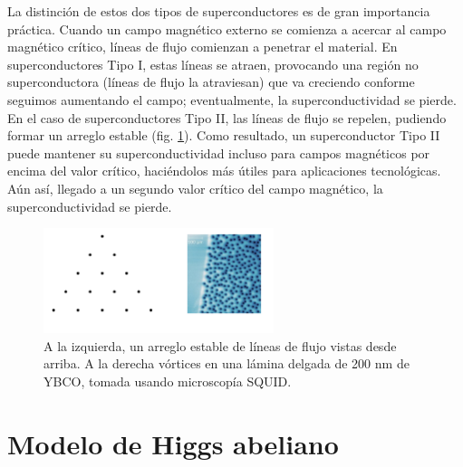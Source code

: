 La distinción de estos dos tipos de superconductores es de gran importancia práctica. Cuando un campo magnético externo se comienza a acercar al campo magnético crítico, líneas de flujo comienzan a penetrar el material. En superconductores Tipo I, estas líneas se atraen, provocando una región no superconductora (líneas de flujo la atraviesan) que va creciendo conforme seguimos aumentando el campo; eventualmente, la superconductividad se pierde. En el caso de superconductores Tipo II, las líneas de flujo se repelen, pudiendo formar un arreglo estable (fig. \ref{fig:4}). Como resultado, un superconductor Tipo II puede mantener su superconductividad incluso para campos magnéticos por encima del valor crítico, haciéndolos más útiles para aplicaciones tecnológicas.  Aún así, llegado a un segundo valor crítico del campo magnético, la superconductividad se pierde.

\begin{figure}[ht]
	\centering
	\includegraphics[width=0.6\textwidth]{gfx/type2superconductor.png}
	\caption{A la izquierda, un arreglo estable de líneas de flujo vistas desde arriba. A la derecha vórtices en una lámina delgada de 200 nm de YBCO, tomada usando microscopía SQUID.}
	\label{fig:4}
\end{figure}


\section{Modelo de Higgs abeliano}

